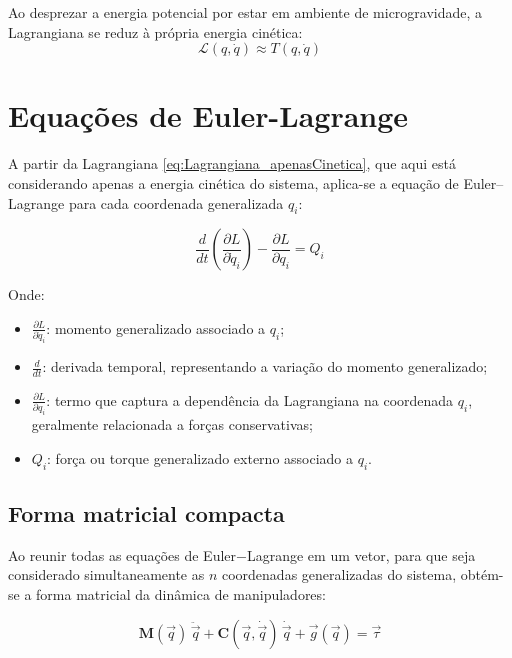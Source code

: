 
Ao desprezar a energia potencial por estar em ambiente de microgravidade, a Lagrangiana se reduz à própria energia cinética:
\begin{equation}
    \label{eq:Lagrangiana_apenasCinetica}
\mathcal{L}(q, \dot{q}) \approx T(q, \dot{q})
\end{equation}

\section{Equações de Euler-Lagrange}

A partir da Lagrangiana \eqref{eq:Lagrangiana_apenasCinetica}, que aqui está considerando apenas a energia cinética do sistema, aplica-se a equação de Euler–Lagrange para cada coordenada generalizada $q_i$:

\begin{equation}
\frac{d}{dt}\left(\frac{\partial L}{\partial \dot{q}_i}\right) - \frac{\partial L}{\partial q_i} = Q_i
\end{equation}

Onde:
\begin{itemize}
    \item $\frac{\partial L}{\partial \dot{q}_i}$: momento generalizado associado a $q_i$;
    \item $\frac{d}{dt}$: derivada temporal, representando a variação do momento generalizado;
    \item $\frac{\partial L}{\partial q_i}$: termo que captura a dependência da Lagrangiana na coordenada $q_i$, geralmente relacionada a forças conservativas;
    \item $Q_i$: força ou torque generalizado externo associado a $q_i$.
\end{itemize}

\subsection{Forma matricial compacta}
Ao reunir todas as equações de Euler$-$Lagrange em um vetor, para que seja considerado simultaneamente as $n$ coordenadas generalizadas do sistema, obtém-se a forma matricial da dinâmica de manipuladores:

\begin{equation}
\mathbf{M}(\vec{q}) \, \ddot{\vec{q}} +
\mathbf{C}(\vec{q}, \dot{\vec{q}})\,\dot{\vec{q}} +
\vec{g}(\vec{q}) = \vec{\tau}
\end{equation}

